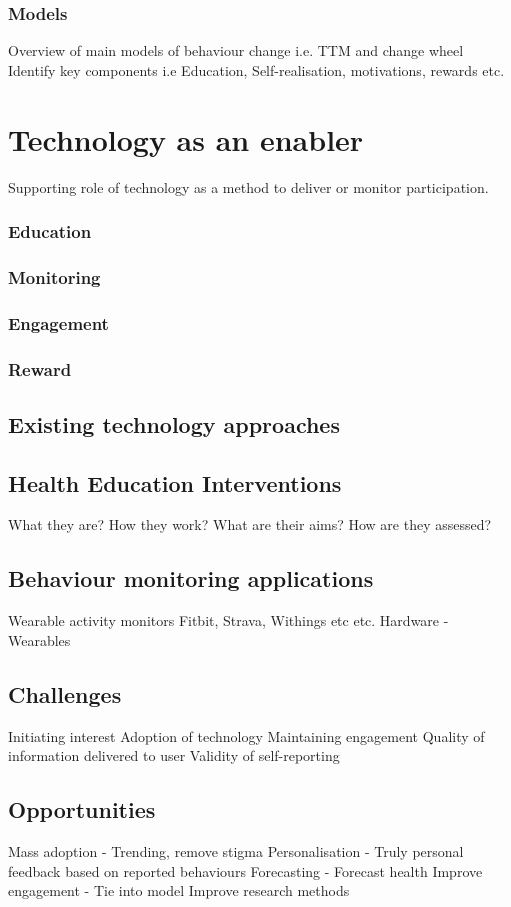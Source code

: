 \subsubsection{Models}
Overview of main models of behaviour change i.e. TTM and change wheel
Identify key components
i.e Education, Self-realisation, motivations, rewards etc.

\section{Technology as an enabler}
Supporting role of technology as a method to deliver or monitor participation. 

\subsubsection{Education}
\subsubsection{Monitoring}
\subsubsection{Engagement}
\subsubsection{Reward}

\subsection{Existing technology approaches}


\subsection{Health Education Interventions}
What they are?
How they work?
What are their aims?
How are they assessed?

\subsection{Behaviour monitoring applications}
Wearable activity monitors
Fitbit, Strava, Withings etc etc.
Hardware - Wearables

\subsection{Challenges}
Initiating interest
Adoption of technology
Maintaining engagement
Quality of information delivered to user
Validity of self-reporting

\subsection{Opportunities}
Mass adoption - Trending, remove stigma
Personalisation - Truly personal feedback based on reported behaviours
Forecasting - Forecast health 
Improve engagement - Tie into model
Improve research methods
